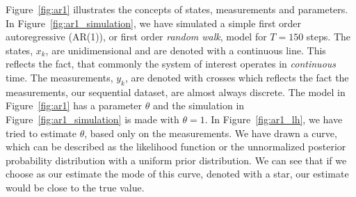 Figure~\ref{fig:ar1} illustrates the concepts of states, measurements and parameters. In
Figure~\ref{fig:ar1_simulation}, we have simulated a simple first order autoregressive (AR(1)), or first order
\emph{random walk}, model for $T=150$ steps. The states, $x_k$, are unidimensional and are denoted with a continuous
line. This reflects the fact, that commonly the system of interest operates in \emph{continuous}
time. The measurements, $y_k$, are denoted with crosses which reflects the fact the 
measurements, our sequential dataset, are almost always discrete. The model in Figure~\ref{fig:ar1}
has a parameter $\theta$ and the simulation
in Figure~\ref{fig:ar1_simulation} is made with $\theta=1$. In Figure~\ref{fig:ar1_lh}, we have
tried to estimate $\theta$, based only on the measurements. We have drawn a curve, which
can be described as the likelihood function or the unnormalized posterior probability distribution
with a uniform prior distribution. We can see that if we choose as our estimate the mode 
of this curve, denoted with a star, our estimate would be close to the true value. 
%
% 
